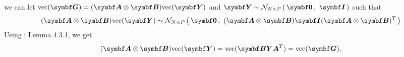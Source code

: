 %
we can let  \(\text{vec} (\mat{G}) =  (\mat{A} \otimes \mat{B}) \text{vec} (\mat{Y})\)  and \(\mat{Y} \sim \multinormal N P {\mat{0}} {\mat{I}}\) such that
%
\begin{equation}
\begin{aligned}
(\mat{A} \otimes\mat{B}) \text{vec} (\mat{Y})  \sim \multinormal N P {\mat{0}} {(\mat{A} \otimes \mat{B}) \mat{I} (\mat{A} \otimes \mat{B})^T}
\end{aligned}
\end{equation}
%
Using \citep{Horn1985}: Lemma 4.3.1, we get 
\begin{equation}
(\mat{A} \otimes \mat{B}) \text{vec}(\mat{Y}) = \text{vec}(\mat{BYA}^T) = \text{vec}(\mat{G}).
\label{eq:G-vec}
\end{equation}
%



